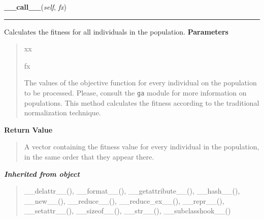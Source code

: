 \hspace{.8\funcindent}\begin{boxedminipage}{\funcwidth}

    \raggedright \textbf{\_\_call\_\_}(\textit{self}, \textit{fx})

    \vspace{-1.5ex}

    \rule{\textwidth}{0.5\fboxrule}
\setlength{\parskip}{2ex}

Calculates the fitness for all individuals in the population.
\setlength{\parskip}{1ex}
      \textbf{Parameters}
      \vspace{-1ex}

      \begin{quote}
        \begin{Ventry}{xx}

          \item[fx]


The values of the objective function for every individual on the
population to be processed. Please, consult the \texttt{ga} module for
more information on populations. This method calculates the fitness
according to the traditional normalization technique.
        \end{Ventry}

      \end{quote}

      \textbf{Return Value}
    \vspace{-1ex}

      \begin{quote}

A vector containing the fitness value for every individual in the
population, in the same order that they appear there.
      \end{quote}

    \end{boxedminipage}


\large{\textbf{\textit{Inherited from object}}}

\begin{quote}
\_\_delattr\_\_(), \_\_format\_\_(), \_\_getattribute\_\_(), \_\_hash\_\_(), \_\_new\_\_(), \_\_reduce\_\_(), \_\_reduce\_ex\_\_(), \_\_repr\_\_(), \_\_setattr\_\_(), \_\_sizeof\_\_(), \_\_str\_\_(), \_\_subclasshook\_\_()
\end{quote}


